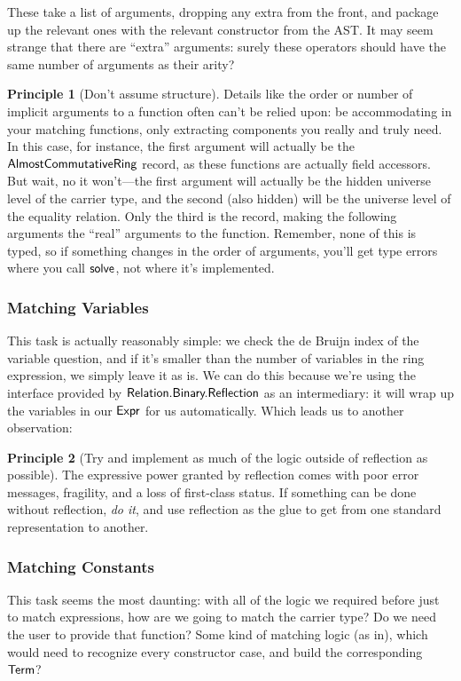 \documentclass[draft, twocolumn]{article}
\theoremstyle{definition}
\theoremstyle{definition}
\newtheorem{principle}{Principle}[section]
\begin{document}
These take a list of arguments, dropping any extra from the front, and package
up the relevant ones with the relevant constructor from the AST. It may seem
strange that there are ``extra'' arguments: surely these operators should have
the same number of arguments as their arity?

\begin{principle}[Don't assume structure]
  Details like the order or number of implicit arguments to a function often
  can't be relied upon: be accommodating in your matching functions, only
  extracting components you really and truly need. In this case, for instance,
  the first argument will actually be the
  \(\AgdaDatatype{AlmostCommutativeRing}\) record, as these functions are
  actually field accessors. But wait, no it won't---the first argument will
  actually be the hidden universe level of the carrier type, and the second
  (also hidden) will be the universe level of the equality relation. Only the
  third is the record, making the following arguments the ``real'' arguments to
  the function. Remember, none of this is typed, so if something changes in the
  order of arguments, you'll get type errors where you call
  \(\AgdaMacro{solve}\), not where it's implemented.
\end{principle}
\subsubsection{Matching Variables}
This task is actually reasonably simple: we check the de Bruijn index of the
variable question, and if it's smaller than the number of variables in the ring
expression, we simply leave it as is. We can do this because we're using the
interface provided by \(\AgdaModule{Relation.Binary.Reflection}\) as an
intermediary: it will wrap up the variables in our \(\AgdaDatatype{Expr}\) for
us automatically. Which leads us to another observation:
\begin{principle}[Try and implement as much of the logic outside of reflection
    as possible]
  The expressive power granted by reflection comes with poor error messages,
  fragility, and a loss of first-class status. If something can be done without
  reflection, \emph{do it}, and use reflection as the glue to get from one
  standard representation to another.
\end{principle}
\subsubsection{Matching Constants}
This task seems the most daunting: with all of the logic we required before just
to match expressions, how are we going to match the carrier type? Do we need the
user to provide that function? Some kind of matching logic (as
in\cite{jedynak_simple_2018}), which would need to recognize every constructor
case, and build the corresponding \(\AgdaDatatype{Term}\)?
\end{document}
